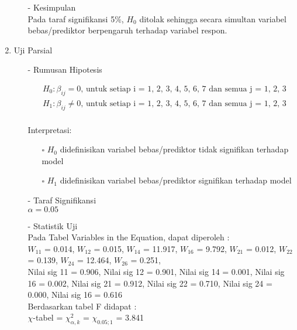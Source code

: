 \begin{enumerate}
\begin{test}
{\begin{enumerate}
        \item[-] Kesimpulan \\
        Pada taraf signifikansi 5\%, $H_0$ ditolak sehingga secara simultan variabel bebas/prediktor berpengaruh terhadap variabel respon. 
    \end{enumerate}
    }
    \end{test}
    
    \item Uji Parsial
    \begin{test}{
    \begin{enumerate}
        \item[-] Rumusan Hipotesis \\
        \begin{fleqn}[\parindent]
            \begin{equation*}
            \begin{split}
            &H_0 : \beta_{ij} = 0 \text{, untuk setiap i = 1, 2, 3, 4, 5, 6, 7 dan semua j = 1, 2, 3} \\ 
            &H_1 : \beta_{ij} \neq 0 \text{, untuk setiap i = 1, 2, 3, 4, 5, 6, 7 dan semua j = 1, 2, 3} \\
            \end{split}
            \end{equation*}
        \end{fleqn}
        Interpretasi:
        \begin{enumerate}
        \item[$\square$] $H_0$ didefinisikan variabel bebas/prediktor tidak signifikan terhadap model
        \item[$\square$] $H_1$ didefinisikan variabel bebas/prediktor signifikan terhadap model
        \end{enumerate}
    
        \item[-] Taraf Signifikansi \\
        $\alpha = 0.05$
    
        \item[-] Statistik Uji \\
        Pada Tabel Variables in the Equation, dapat diperoleh : \\
        $W_{11}$ = 0.014, $W_{12}$ = 0.015, $W_{14}$ = 11.917, $W_{16}$ = 9.792, $W_{21}$ = 0.012, $W_{22}$ = 0.139, $W_{24}$ = 12.464, $W_{26}$ = 0.251,  
        \\ Nilai sig 11 = 0.906, Nilai sig 12 = 0.901, Nilai sig 14 = 0.001, Nilai sig 16 = 0.002, Nilai sig 21 = 0.912, Nilai sig 22 = 0.710, Nilai sig 24 = 0.000, Nilai sig 16 = 0.616 \\
        Berdasarkan tabel F didapat : \\
        $\chi$-tabel = $\chi_{\alpha, k}^2$ = $\chi_{0.05; 1}$ = 3.841
    

\end{enumerate}}
\end{test}
\end{enumerate}
